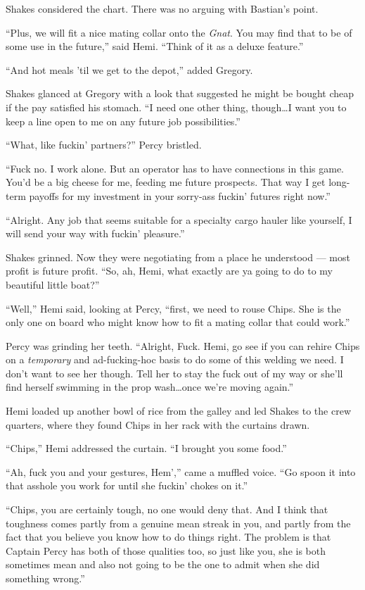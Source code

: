 \documentclass[
]{scrbook}
\begin{document}
Shakes considered the chart. There was no arguing with Bastian's point.

``Plus, we will fit a nice mating collar onto the \emph{Gnat}. You may
find that to be of some use in the future,'' said Hemi. ``Think of it as
a deluxe feature.''

``And hot meals 'til we get to the depot,'' added Gregory.

Shakes glanced at Gregory with a look that suggested he might be bought
cheap if the pay satisfied his stomach. ``I need one other thing,
though\ldots I want you to keep a line open to me on any future job
possibilities.''

``What, like fuckin' partners?'' Percy bristled.

``Fuck no. I work alone. But an operator has to have connections in this
game. You'd be a big cheese for me, feeding me future prospects. That
way I get long-term payoffs for my investment in your sorry-ass fuckin'
futures right now.''

``Alright. Any job that seems suitable for a specialty cargo hauler like
yourself, I will send your way with fuckin' pleasure.''

Shakes grinned. Now they were negotiating from a place he understood ---
most profit is future profit. ``So, ah, Hemi, what exactly are ya going
to do to my beautiful little boat?''

``Well,'' Hemi said, looking at Percy, ``first, we need to rouse Chips.
She is the only one on board who might know how to fit a mating collar
that could work.''

Percy was grinding her teeth. ``Alright, Fuck. Hemi, go see if you can
rehire Chips on a \emph{temporary} and ad-fucking-hoc basis to do some
of this welding we need. I don't want to see her though. Tell her to
stay the fuck out of my way or she'll find herself swimming in the prop
wash\ldots once we're moving again.''

\bigskip

Hemi loaded up another bowl of rice from the galley and led Shakes to
the crew quarters, where they found Chips in her rack with the curtains
drawn.

``Chips,'' Hemi addressed the curtain. ``I brought you some food.''

``Ah, fuck you and your gestures, Hem','' came a muffled voice. ``Go
spoon it into that asshole you work for until she fuckin' chokes on
it.''

``Chips, you are certainly tough, no one would deny that. And I think
that toughness comes partly from a genuine mean streak in you, and
partly from the fact that you believe you know how to do things right.
The problem is that Captain Percy has both of those qualities too, so
just like you, she is both sometimes mean and also not going to be the
one to admit when she did something wrong.''
\end{document}
